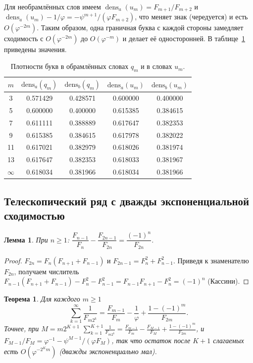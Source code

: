 \documentclass[a4paper,14pt]{extreport}
\theoremstyle{plain}
\newtheorem{theorem}{Теорема}[section]
\newtheorem{lemma}{Лемма}[section]
\theoremstyle{definition}
\theoremstyle{remark}
\begin{document}
Для необрамлённых слов имеем $\operatorname{dens}_a(u_m)=F_{m+1}/F_{m+2}$ и
$\operatorname{dens}_a(u_m)-1/\varphi=-\psi^{m+1}/(\varphi F_{m+2})$, что меняет знак (чередуется) и есть $O(\varphi^{-2m})$.
Таким образом, одна граничная буква с каждой стороны замедляет сходимость с $O(\varphi^{-2m})$ до $O(\varphi^{-m})$
и делает её односторонней. В таблице~\ref{tab002densitiesASm} приведены значения.

\begin{table}[H]
	\centering
	\small
	\begin{tabular}{ccccc}
		\hline
		$m$ & $\text{dens}_a(q_m)$ & $\text{dens}_b(q_m)$ & $\text{dens}_a(u_m)$ & $\text{dens}_b(u_m)$ \\ \hline
		3  & 0.571429 & 0.428571 & 0.600000 & 0.400000 \\
		5  & 0.600000 & 0.400000 & 0.615385 & 0.384615 \\
		7  & 0.611111 & 0.388889 & 0.617647 & 0.382353 \\
		9  & 0.615385 & 0.384615 & 0.617978 & 0.382022 \\
		11 & 0.617021 & 0.382979 & 0.618026 & 0.381974 \\
		13 & 0.617647 & 0.382353 & 0.618033 & 0.381967 \\ \hline
		$\infty$ & 0.618034 & 0.381966 & 0.618034 & 0.381966 \\ \hline
	\end{tabular}
	\caption{Плотности букв в обрамлённых словах $q_m$ и в словах $u_m$.}
	\label{tab002densitiesASm}
\end{table}
\subsection{Телескопический ряд с дважды экспоненциальной сходимостью}\label{sec:millin}

\begin{lemma}\label{lem:telesc}
	При $n\ge1$: $\dfrac{F_{n-1}}{F_n}-\dfrac{F_{2n-1}}{F_{2n}}=\dfrac{(-1)^n}{F_{2n}}$.
\end{lemma}
\begin{proof}
	$F_{2n}=F_n(F_{n+1}+F_{n-1})$ и $F_{2n-1}=F_n^2+F_{n-1}^2$. Приведя к знаменателю $F_{2n}$,
	получаем числитель $F_{n-1}(F_{n+1}+F_{n-1})-F_n^2-F_{n-1}^2=F_{n-1}F_{n+1}-F_n^2=(-1)^n$ (Кассини).
\end{proof}

\begin{theorem}\label{thm:millin}
	Для каждого $m\ge1$
	\begin{equation}
		\sum_{k=1}^{\infty}\frac1{F_{m2^k}}=\frac{F_{m-1}}{F_m}-\frac1\varphi+\frac{1-(-1)^m}{F_{2m}} .
	\end{equation}
	Точнее, при $M=m2^{K+1}$
	$\displaystyle\sum_{k=1}^{K+1}\frac1{F_{m2^k}}=\frac{F_{m-1}}{F_m}-\frac{F_{M-1}}{F_M}+\frac{1-(-1)^m}{F_{2m}}$,
	и $F_{M-1}/F_M=\varphi^{-1}-\psi^{M-1}/(\varphi F_M)$, так что остаток после $K+1$ слагаемых есть $O(\varphi^{-2^{K}m})$ (дважды экспоненциально мал).
\end{theorem}
\end{document}
